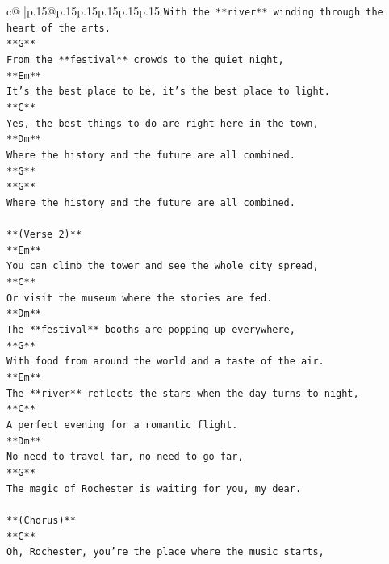 \documentclass{article}
\begin{document}
{\begin{supertabular}{c@{$\;$}|p{.15\linewidth}@{}p{.15\linewidth}p{.15\linewidth}p{.15\linewidth}p{.15\linewidth}p{.15\linewidth}}
{{{\texttt{With the **river** winding through the heart of the arts.} \\
\texttt{**G**} \\
\texttt{From the **festival** crowds to the quiet night,} \\
\texttt{**Em**} \\
\texttt{It's the best place to be, it's the best place to light.} \\
\texttt{**C**} \\
\texttt{Yes, the best things to do are right here in the town,} \\
\texttt{**Dm**} \\
\texttt{Where the history and the future are all combined.} \\
\texttt{**G**} \\
\texttt{**G**} \\
\texttt{Where the history and the future are all combined.} \\
\\ 
\texttt{**(Verse 2)**} \\
\texttt{**Em**} \\
\texttt{You can climb the tower and see the whole city spread,} \\
\texttt{**C**} \\
\texttt{Or visit the museum where the stories are fed.} \\
\texttt{**Dm**} \\
\texttt{The **festival** booths are popping up everywhere,} \\
\texttt{**G**} \\
\texttt{With food from around the world and a taste of the air.} \\
\texttt{**Em**} \\
\texttt{The **river** reflects the stars when the day turns to night,} \\
\texttt{**C**} \\
\texttt{A perfect evening for a romantic flight.} \\
\texttt{**Dm**} \\
\texttt{No need to travel far, no need to go far,} \\
\texttt{**G**} \\
\texttt{The magic of Rochester is waiting for you, my dear.} \\
\\ 
\texttt{**(Chorus)**} \\
\texttt{**C**} \\
\texttt{Oh, Rochester, you're the place where the music starts,} \\
}}}
\end{supertabular}}
\end{document}
